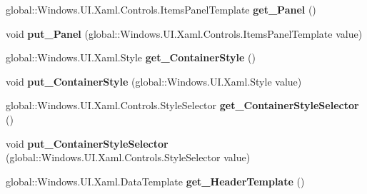 \begin{DoxyCompactItemize}
\item 
\mbox{\label{interface_windows_1_1_u_i_1_1_xaml_1_1_controls_1_1_i_group_style_a0c9c3cde89c2eb82c05931ac6a601a16}} 
global\+::\+Windows.\+U\+I.\+Xaml.\+Controls.\+Items\+Panel\+Template {\bfseries get\+\_\+\+Panel} ()
\item 
\mbox{\label{interface_windows_1_1_u_i_1_1_xaml_1_1_controls_1_1_i_group_style_a54431a2fb424c8ee66764a90f1eb3a72}} 
void {\bfseries put\+\_\+\+Panel} (global\+::\+Windows.\+U\+I.\+Xaml.\+Controls.\+Items\+Panel\+Template value)
\item 
\mbox{\label{interface_windows_1_1_u_i_1_1_xaml_1_1_controls_1_1_i_group_style_af3ec155955e17dff84857535074042f7}} 
global\+::\+Windows.\+U\+I.\+Xaml.\+Style {\bfseries get\+\_\+\+Container\+Style} ()
\item 
\mbox{\label{interface_windows_1_1_u_i_1_1_xaml_1_1_controls_1_1_i_group_style_af0d3f03b233d17bef1f3a1cf829ca1b7}} 
void {\bfseries put\+\_\+\+Container\+Style} (global\+::\+Windows.\+U\+I.\+Xaml.\+Style value)
\item 
\mbox{\label{interface_windows_1_1_u_i_1_1_xaml_1_1_controls_1_1_i_group_style_a56b3461ac75ac985ef5d7d81a6c6a9cf}} 
global\+::\+Windows.\+U\+I.\+Xaml.\+Controls.\+Style\+Selector {\bfseries get\+\_\+\+Container\+Style\+Selector} ()
\item 
\mbox{\label{interface_windows_1_1_u_i_1_1_xaml_1_1_controls_1_1_i_group_style_a02ae70e78fa1f73a90c99f25ffb93918}} 
void {\bfseries put\+\_\+\+Container\+Style\+Selector} (global\+::\+Windows.\+U\+I.\+Xaml.\+Controls.\+Style\+Selector value)
\item 
\mbox{\label{interface_windows_1_1_u_i_1_1_xaml_1_1_controls_1_1_i_group_style_ae2c73494e7acf4a2194f66515b44cb36}} 
global\+::\+Windows.\+U\+I.\+Xaml.\+Data\+Template {\bfseries get\+\_\+\+Header\+Template} ()

\end{DoxyCompactItemize}
